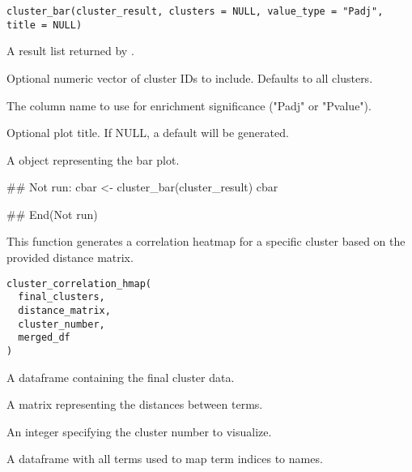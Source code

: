 \documentclass[a4paper]{book}
\begin{document}
%
\begin{Usage}
\begin{verbatim}
cluster_bar(cluster_result, clusters = NULL, value_type = "Padj", title = NULL)
\end{verbatim}
\end{Usage}
%
\begin{Arguments}
\begin{ldescription}
\item[\code{cluster\_result}] A result list returned by .

\item[\code{clusters}] Optional numeric vector of cluster IDs to include. Defaults to all clusters.

\item[\code{value\_type}] The column name to use for enrichment significance ("Padj" or "Pvalue").

\item[\code{title}] Optional plot title. If NULL, a default will be generated.
\end{ldescription}
\end{Arguments}
%
\begin{Value}
A  object representing the bar plot.
\end{Value}
%
\begin{Examples}
\begin{ExampleCode}
## Not run: 
cbar <- cluster_bar(cluster_result)
cbar

## End(Not run)
\end{ExampleCode}
\end{Examples}
%
\begin{Description}
This function generates a correlation heatmap for a specific cluster based on the provided distance matrix.
\end{Description}
%
\begin{Usage}
\begin{verbatim}
cluster_correlation_hmap(
  final_clusters,
  distance_matrix,
  cluster_number,
  merged_df
)
\end{verbatim}
\end{Usage}
%
\begin{Arguments}
\begin{ldescription}
\item[\code{final\_clusters}] A dataframe containing the final cluster data.

\item[\code{distance\_matrix}] A matrix representing the distances between terms.

\item[\code{cluster\_number}] An integer specifying the cluster number to visualize.

\item[\code{merged\_df}] A dataframe with all terms used to map term indices to names.
\end{ldescription}
\end{Arguments}
\end{document}

